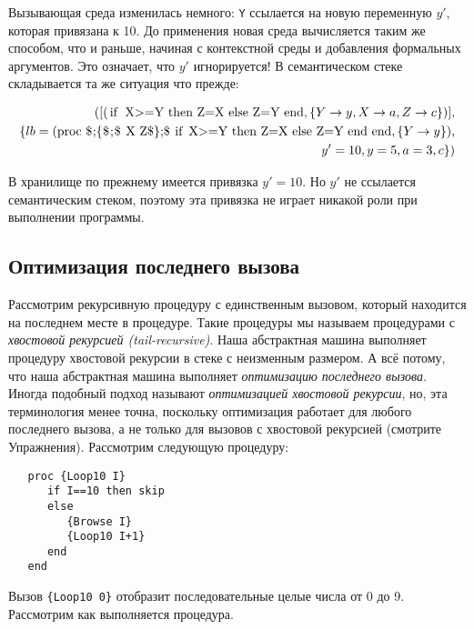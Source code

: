 Вызывающая среда изменилась немного: \lstinline|Y| ссылается на новую переменную $y'$, которая привязана к 10. До применения новая среда вычисляется таким же способом, что и раньше, начиная с контекстной среды и добавления формальных аргументов. Это означает, что $y'$ игнорируется! В семантическом стеке складывается та же ситуация что прежде:

\begin{eqnarray*}
( [(\text{\lstinline|if X>=Y then Z=X else Z=Y end|}, \{Y \to y, X \to a, Z \to c\})], \\
\{ lb = (\text{\lstinline|proc $\;\{\$\;$ X Z$\}\;$ if X>=Y then Z=X else Z=Y end end|}, \{Y \to y\}), \\
y' = 10, y = 5, a = 3, c\} )
\end{eqnarray*}

В хранилище по прежнему имеется привязка $y'=10$. Но $y'$ не ссылается семантическим стеком, поэтому эта привязка не играет никакой роли при выполнении программы.

\subsection{Оптимизация последнего вызова}\label{subsection:last_call_optimization}

Рассмотрим рекурсивную процедуру с единственным вызовом, который находится на последнем месте в процедуре. Такие процедуры мы называем процедурами с \emph{хвостовой рекурсией (tail-recursive)}. Наша абстрактная машина выполняет процедуру хвостовой рекурсии в стеке с неизменным размером. А всё потому, что наша абстрактная машина выполняет \emph{оптимизацию последнего вызова}. Иногда подобный подход называют \emph{оптимизацией хвостовой рекурсии}, но, эта терминология менее точна, поскольку оптимизация работает для любого последнего вызова, а не только для вызовов с хвостовой рекурсией (смотрите Упражнения). Рассмотрим следующую процедуру:

\begin{lstlisting}
   proc {Loop10 I}
      if I==10 then skip
      else
         {Browse I}
         {Loop10 I+1}
      end
   end
\end{lstlisting}

Вызов \lstinline|{Loop10 0}| отобразит последовательные целые числа от 0 до 9. Рассмотрим как выполняется процедура.

